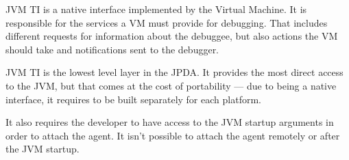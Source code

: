 \documentclass[..thesis.tex]{subfiles}
\begin{document}
JVM TI is a native interface implemented by the Virtual Machine.
It is responsible for the services a VM must provide for debugging.
That includes different requests for information about the debuggee, but also actions the VM should take and notifications sent to the debugger.\cite{oracle_jpda_jvmti}

JVM TI is the lowest level layer in the JPDA. 
It provides the most direct access to the JVM, but that comes at the cost of portability --- due to being a native interface, it requires to be built separately for each platform.

It also requires the developer to have access to the JVM startup arguments in order to attach the agent. It isn't possible to attach the agent remotely or after the JVM startup.
\end{document}
